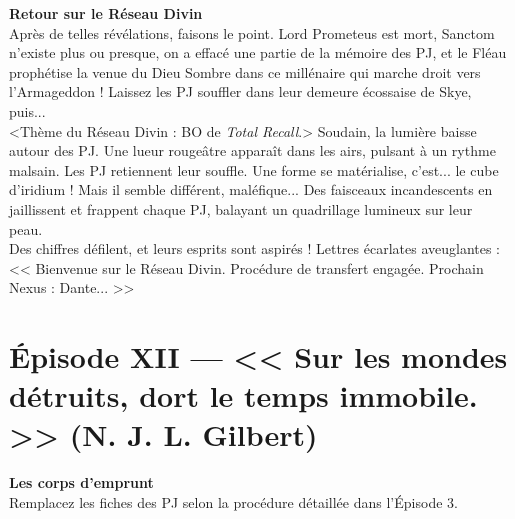 \documentclass[11pt,twoside,a4paper]{book}
\begin{document}
\textbf{\large Retour sur le R{\'e}seau Divin}~\\

Apr{\`e}s de telles r{\'e}v{\'e}lations, faisons le point. Lord Prometeus est mort, Sanctom n'existe plus ou presque, on a effac{\'e} une partie de la m{\'e}moire des PJ, et le Fl{\'e}au proph{\'e}tise la venue du Dieu Sombre dans ce mill{\'e}naire qui marche droit vers l'Armageddon ! Laissez les PJ souffler dans leur demeure {\'e}cossaise de Skye, puis...~\\

<Th{\`e}me du R{\'e}seau Divin : BO de \emph{Total Recall}.> Soudain, la lumi{\`e}re baisse autour des PJ. Une lueur rouge{\^a}tre appara{\^i}t dans les airs, pulsant {\`a} un rythme malsain. Les PJ retiennent leur souffle. Une forme se mat{\'e}rialise, c'est... le cube d'iridium ! Mais il semble diff{\'e}rent, mal{\'e}fique... Des faisceaux incandescents en jaillissent et frappent chaque PJ, balayant un quadrillage lumineux sur leur peau.~\\

Des chiffres d{\'e}filent, et leurs esprits sont aspir{\'e}s ! Lettres {\'e}carlates aveuglantes : << Bienvenue sur le R{\'e}seau Divin. Proc{\'e}dure de transfert engag{\'e}e. Prochain Nexus : Dante... >>~\\

\clearpage

\section*{{\'E}pisode XII --- << \textbf{Sur les mondes d{\'e}truits, dort le temps immobile. } >> (N. J. L. Gilbert)}


\textbf{\large Les corps d'emprunt}~\\

Remplacez les fiches des PJ selon la proc{\'e}dure d{\'e}taill{\'e}e dans l'{\'E}pisode 3.~\\
\end{document}
